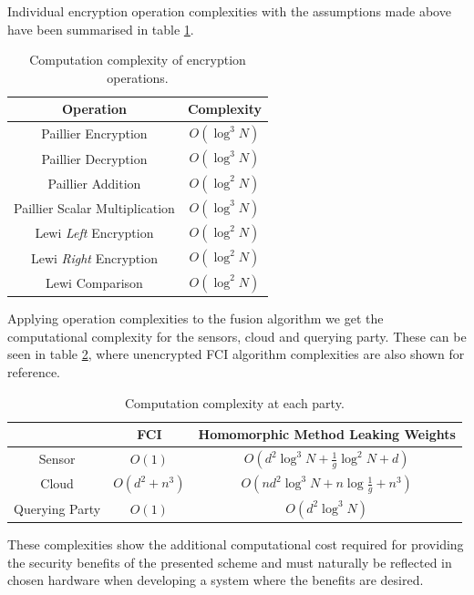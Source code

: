 Individual encryption operation complexities with the assumptions made above have been summarised in table \ref{tab:cloud_fusion:secfci_op_complexity}. 
\begin{table}[htbp]
    \centering
    \caption{Computation complexity of encryption operations.}
    \label{tab:cloud_fusion:secfci_op_complexity}
    \begin{tabular}{|c|c|}
        \hline
        \textbf{Operation} & \textbf{Complexity} \\ 
        \hline
        Paillier Encryption & $O(\log^3{N})$ \\ 
        Paillier Decryption & $O(\log^3{N})$ \\ 
        Paillier Addition & $O(\log^2{N})$ \\ 
        Paillier Scalar Multiplication & $O(\log^3{N})$ \\ 
        Lewi \textit{Left} Encryption & $O(\log^2{N})$ \\ 
        Lewi \textit{Right} Encryption & $O(\log^2{N})$ \\ 
        Lewi Comparison & $O(\log^2{N})$ \\ 
        \hline
    \end{tabular}
\end{table}
Applying operation complexities to the fusion algorithm we get the computational complexity for the sensors, cloud and querying party. These can be seen in table \ref{tab:cloud_fusion:secfci_complexity}, where unencrypted FCI algorithm complexities are also shown for reference. 
\begin{table}[htbp]
   \centering
   \caption{Computation complexity at each party.}
   \label{tab:cloud_fusion:secfci_complexity}
   \begin{tabular}{|c|c|c|}
      \hline
       & \textbf{FCI} & \textbf{Homomorphic Method Leaking Weights} \\ 
      \hline
      Sensor & $O(1)$ & $O\left(d^2\log^3{N} + \frac{1}{g}\log^2{N} + d\right)$ \\ 
      Cloud & $O(d^2+n^3)$ & $O\left(nd^2\log^3{N} + n\log{\frac{1}{g}} + n^3\right)$ \\ 
      Querying Party & $O(1)$ & $O\left(d^2\log^3{N}\right)$ \\ 
      \hline
   \end{tabular}
\end{table}
These complexities show the additional computational cost required for providing the security benefits of the presented scheme and must naturally be reflected in chosen hardware when developing a system where the benefits are desired.

